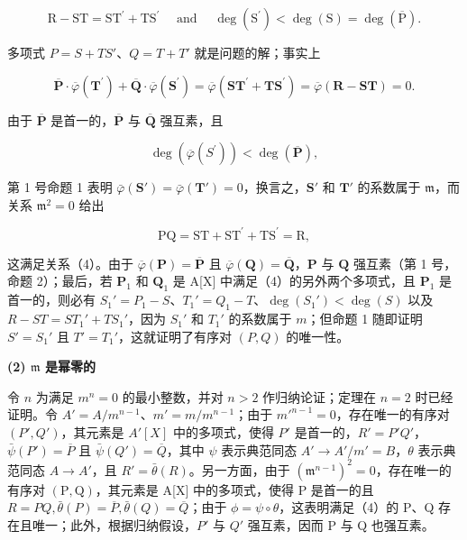 \[
\mathrm{R} - \mathrm{ST} = \mathrm{ST} ^ {\prime} + \mathrm{TS} ^ {\prime} \quad \text { and } \quad \deg (\mathrm{S} ^ {\prime}) <   \deg (\mathrm{S}) = \deg (\overline {{\mathrm{P}}}).\tag{5}
\]

多项式 \(P = S + TS'\)、\(Q = T + T'\) 就是问题的解；事实上

\[
\overline {{{\mathbf {P}}}} \cdot \overline {{{\varphi}}} (\mathbf {T} ^ {\prime}) + \overline {{{\mathbf {Q}}}} \cdot \overline {{{\varphi}}} (\mathbf {S} ^ {\prime}) = \overline {{{\varphi}}} (\mathbf {S T} ^ {\prime} + \mathbf {T S} ^ {\prime}) = \overline {{{\varphi}}} (\mathbf {R} - \mathbf {S T}) = 0.\tag{6}
\]

由于 \(\overline{\mathbf{P}}\) 是首一的，\(\overline{\mathbf{P}}\) 与 \(\overline{\mathbf{Q}}\) 强互素，且

\[
\deg (\overline {{{\varphi}}} (S ^ {\prime})) <   \deg (\overline {{{\mathbf {P}}}}),
\]

第 1 号命题 1 表明 \(\bar{\varphi}(\mathbf{S}') = \bar{\varphi}(\mathbf{T}') = 0\)，换言之，\(\mathbf{S}'\) 和 \(\mathbf{T}'\) 的系数属于 \(\mathfrak{m}\)，而关系 \(\mathfrak{m}^2 = 0\) 给出

\[
\mathrm{PQ} = \mathrm{ST} + \mathrm{ST} ^ {\prime} + \mathrm{TS} ^ {\prime} = \mathrm{R},
\]

这满足关系（4）。由于 \(\overline{\varphi}(\mathbf{P}) = \overline{\mathbf{P}}\) 且 \(\overline{\varphi}(\mathbf{Q}) = \overline{\mathbf{Q}}\)，\(\mathbf{P}\) 与 \(\mathbf{Q}\) 强互素（第 1 号，命题 2）；最后，若 \(\mathbf{P}_1\) 和 \(\mathbf{Q}_1\) 是 A{[}X{]} 中满足（4）的另外两个多项式，且 \(\mathbf{P}_1\) 是首一的，则必有 \(S_1' = P_1 - S\)、\(T_1' = Q_1 - T\)、\(\deg(S_1') < \deg(S)\) 以及 \(R - ST = ST_1' + TS_1'\)，因为 \(S_1'\) 和 \(T_1'\) 的系数属于 \(m\)；但命题 1 随即证明 \(S' = S_1'\) 且 \(T' = T_1'\)，这就证明了有序对 \((P, Q)\) 的唯一性。

\textbf{(2) \(\mathfrak{m}\) 是幂零的}\par

令 \(n\) 为满足 \(m^n = 0\) 的最小整数，并对 \(n > 2\) 作归纳论证；定理在 \(n = 2\) 时已经证明。令 \(A' = A / m^{n-1}\)、\(m' = m / m^{n-1}\)；由于 \(m'^{n-1} = 0\)，存在唯一的有序对 \((P', Q')\)，其元素是 \(A'[X]\) 中的多项式，使得 \(P'\) 是首一的，\(R' = P'Q'\)，\(\bar{\psi}(P') = \overline{P}\) 且 \(\bar{\psi}(Q') = \overline{Q}\)，其中 \(\psi\) 表示典范同态 \(A' \to A'/m' = B\)，\(\theta\) 表示典范同态 \(A \to A'\)，且 \(R' = \bar{\theta}(R)\)。另一方面，由于 \((\mathfrak{m}^{n-1})^{2}=0\)，存在唯一的有序对 \((\mathrm{P},\mathrm{Q})\)，其元素是 A{[}X{]} 中的多项式，使得 P 是首一的且 \(R=PQ,\bar{\theta}(P)=\overline{P},\bar{\theta}(Q)=\overline{Q}\)；由于 \(\phi=\psi\circ\theta\)，这表明满足（4）的 P、Q 存在且唯一；此外，根据归纳假设，\(P'\) 与 \(Q'\) 强互素，因而 P 与 Q 也强互素。

